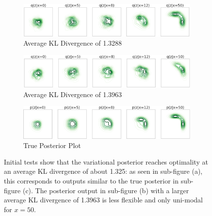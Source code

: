 \documentclass[honours,12pt]{unswthesis}
\numberwithin{equation}{section}
\theoremstyle{definition}
\begin{document}
\begin{figure}[h!]
\begin{subfigure}{\textwidth}
\includegraphics[width=\textwidth]{13288.png}
\caption{Average KL Divergence of 1.3288}
\end{subfigure}
\begin{subfigure}{\textwidth}
\includegraphics[width=\textwidth]{13963.png}
\caption{Average KL Divergence of 1.3963}
\end{subfigure}
\begin{subfigure}{\textwidth}
\includegraphics[width=\textwidth]{sprinklertrue}
\caption{True Posterior Plot}
\end{subfigure}
\caption{\small Initial tests show that the variational posterior reaches optimality at an average KL divergence of about 1.325: as seen in sub-figure (a), this corresponds to outputs similar to the true posterior in sub-figure (c). The posterior output in sub-figure (b) with a larger average KL divergence of 1.3963 is less flexible and only uni-modal for $x=50$.}
\end{figure}
\newpage
\end{document}

